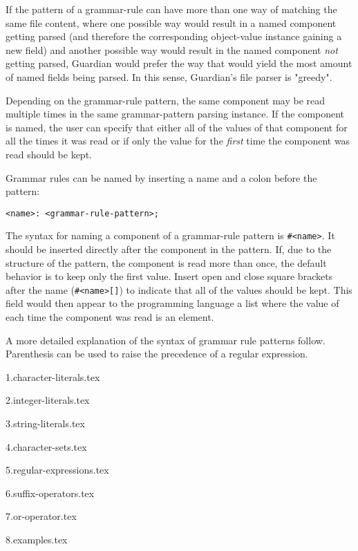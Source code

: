 {	If the pattern of a grammar-rule can have more than one way of matching
	the same file content, where one possible way would result in a named
	component getting parsed (and therefore the corresponding object-value
	instance gaining a new field) and another possible way would result in the
	named component \textit{not} getting parsed, Guardian would prefer the
	way that would yield the most amount of named fields being parsed.
	In this sense, Guardian's file parser is "greedy".
	
	Depending on the grammar-rule pattern, the same component may be read
	multiple times in the same grammar-pattern parsing instance. If the
	component is named, the user can specify that either all of the values
	of that component for all the times it was read or if
	only the value for the \textit{first} time the component was read
	should be kept.
	
	Grammar rules can be named by inserting a name and a colon before the pattern:
	\begin{lstlisting}[numbers = none, texcl = true, language = MAIA]
<name>: <grammar-rule-pattern>;
	\end{lstlisting}
	
	The syntax for naming a component of a grammar-rule pattern is
	\texttt{\#<name>}.
	It should be inserted directly after the component in the pattern.
	If, due to the structure of the pattern, the component is read more than
	once, the default behavior is to keep only the first value. Insert open
	and close square brackets after the name (\texttt{\#<name>[]}) to indicate
	that all of the values should be kept. This field would then appear to the
	programming language a list where the value of each time the component was
	read is an element.
	
	A more detailed explanation of the syntax of grammar rule patterns follow.
	Parenthesis can be used to raise the precedence of a regular expression.
	
	{1.character-literals.tex}
	
	{2.integer-literals.tex}
	
	{3.string-literals.tex}
	
	{4.character-sets.tex}
	
	{5.regular-expressions.tex}
	
	{6.suffix-operators.tex}
	
	{7.or-operator.tex}
	
	{8.examples.tex}
}
















